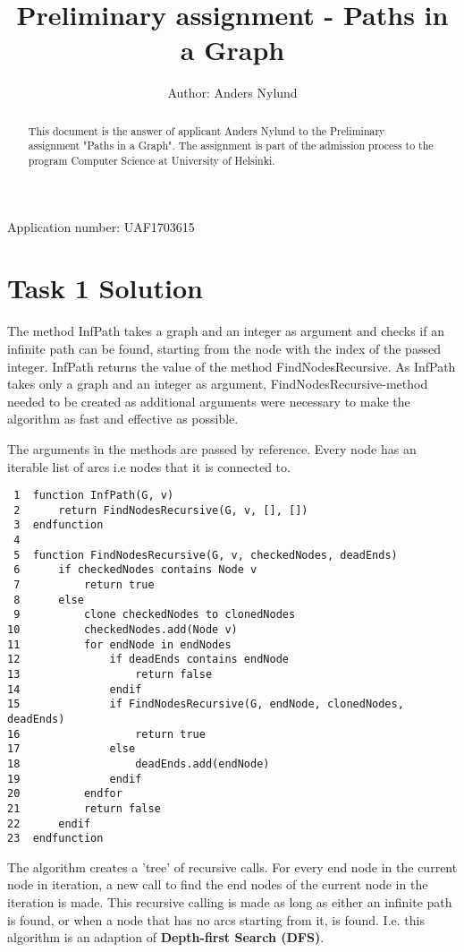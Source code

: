 \documentclass[]{article}
\title{Preliminary assignment - Paths in a Graph}
\author{Author: Anders Nylund}
\begin{document}
\maketitle

\begin{center}
	Application number: UAF1703615
\end{center}

\begin{abstract}
This document is the answer of applicant Anders Nylund to the Preliminary assignment "Paths in a Graph". The assignment is part of the admission process to the program Computer Science at University of Helsinki.
\end{abstract}

\newpage
\section*{Task 1 Solution}

The method InfPath takes a graph and an integer as argument and checks if an infinite path can be found, starting from the node with the index of the passed integer. InfPath returns the value of the method FindNodesRecursive. As InfPath takes only a graph and an integer as argument, FindNodesRecursive-method needed to be created as additional arguments were necessary to make the algorithm as fast and effective as possible.

The arguments in the methods are passed by reference. Every node has an iterable list of arcs i.e nodes that it is connected to.

\begin{lstlisting}
 1	function InfPath(G, v)
 2		return FindNodesRecursive(G, v, [], [])
 3	endfunction
 4
 5	function FindNodesRecursive(G, v, checkedNodes, deadEnds)
 6		if checkedNodes contains Node v
 7			return true
 8		else
 9			clone checkedNodes to clonedNodes
10			checkedNodes.add(Node v)	
11			for endNode in endNodes
12				if deadEnds contains endNode
13					return false
14				endif
15				if FindNodesRecursive(G, endNode, clonedNodes, deadEnds)
16					return true
17				else
18					deadEnds.add(endNode)
19				endif
20			endfor
21			return false
22		endif
23	endfunction
\end{lstlisting}

The algorithm creates a 'tree' of recursive calls. For every end node in the current node in iteration, a new call to find the end nodes of the current node in the iteration is made. This recursive calling is made as long as either an infinite path is found, or when a node that has no arcs starting from it, is found. I.e. this algorithm is an adaption of \textbf{Depth-first Search (DFS)}.
\end{document}
